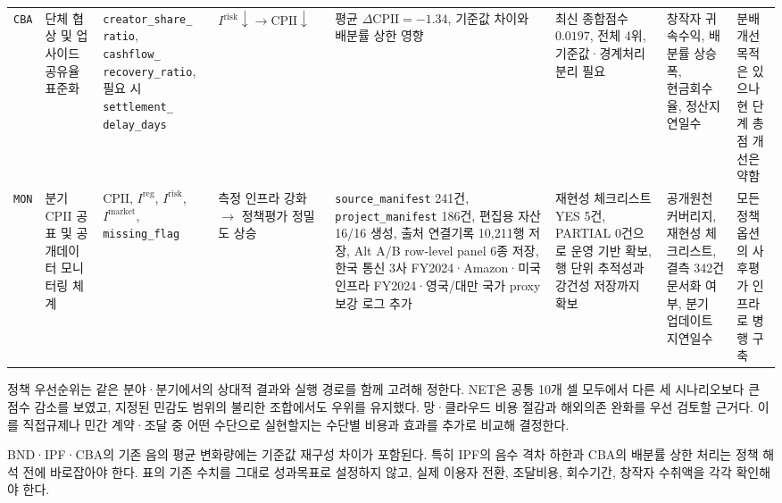 \documentclass[11pt,a4paper]{report}
\begin{document}
\begin{landscape}
\begin{longtable}{@{}L{1.0cm}L{2.6cm}L{3.0cm}L{2.7cm}L{3.1cm}L{3.0cm}L{3.3cm}L{3.0cm}@{}}
\texttt{CBA} & 단체 협상 및 업사이드 공유율 표준화 & \parbox[t]{\linewidth}{\raggedright \texttt{creator\_share\_}\\\texttt{ratio},\\\texttt{cashflow\_}\\\texttt{recovery\_ratio},\\필요 시 \texttt{settlement\_}\\\texttt{delay\_days}} & $I^{\mathrm{risk}} \downarrow \rightarrow \mathrm{CPII}\downarrow$ & \parbox[t]{\linewidth}{\raggedright 평균 $\Delta \mathrm{CPII}=-1.34$,\\기준값 차이와\\배분률 상한 영향} & \parbox[t]{\linewidth}{\raggedright 최신 종합점수 $0.0197$,\\전체 4위,\\기준값·경계처리 분리 필요} & \parbox[t]{\linewidth}{\raggedright 창작자 귀속수익, 배분률 상승폭,\\현금회수율, 정산지연일수} & \parbox[t]{\linewidth}{\raggedright 분배 개선 목적은 있으나\\현 단계 총점 개선은 약함} \\
\texttt{MON} & 분기 CPII 공표 및 공개데이터 모니터링 체계 & $\mathrm{CPII}$, $I^{\mathrm{reg}}$, $I^{\mathrm{risk}}$, $I^{\mathrm{market}}$, \texttt{missing\_flag} & 측정 인프라 강화 $\rightarrow$ 정책평가 정밀도 상승 & \texttt{source\_manifest} 241건, \texttt{project\_manifest} 186건, 편집용 자산 16/16 생성, 출처 연결기록 10{,}211행 저장, Alt A/B row-level panel 6종 저장, 한국 통신 3사 FY2024·Amazon·미국 인프라 FY2024·영국/대만 국가 proxy 보강 로그 추가 & 재현성 체크리스트 YES 5건, PARTIAL 0건으로 운영 기반 확보, 행 단위 추적성과 강건성 저장까지 확보 & 공개원천 커버리지, 재현성 체크리스트, 결측 342건 문서화 여부, 분기 업데이트 지연일수 & 모든 정책 옵션의 사후평가 인프라로 병행 구축 \\
\bottomrule
\end{longtable}
\normalsize
\end{landscape}

정책 우선순위는 같은 분야·분기에서의 상대적 결과와 실행 경로를 함께 고려해 정한다. NET은 공통 10개 셀 모두에서 다른 세 시나리오보다 큰 점수 감소를 보였고, 지정된 민감도 범위의 불리한 조합에서도 우위를 유지했다. 망·클라우드 비용 절감과 해외의존 완화를 우선 검토할 근거다. 이를 직접규제나 민간 계약·조달 중 어떤 수단으로 실현할지는 수단별 비용과 효과를 추가로 비교해 결정한다.

BND·IPF·CBA의 기존 음의 평균 변화량에는 기준값 재구성 차이가 포함된다. 특히 IPF의 음수 격차 하한과 CBA의 배분률 상한 처리는 정책 해석 전에 바로잡아야 한다. 표의 기존 수치를 그대로 성과목표로 설정하지 않고, 실제 이용자 전환, 조달비용, 회수기간, 창작자 수취액을 각각 확인해야 한다.
\end{document}
